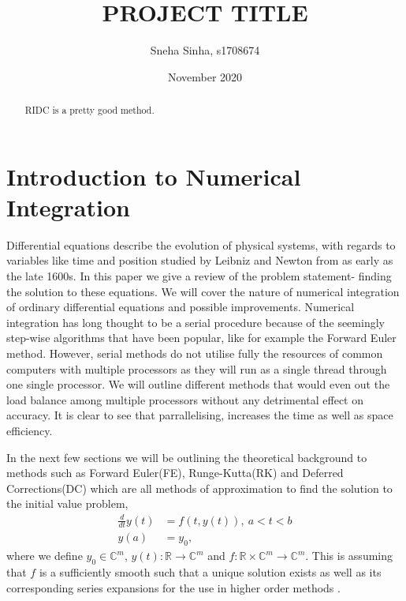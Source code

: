 \documentclass{report}
\title{PROJECT TITLE}
\author{Sneha Sinha, s1708674}
\date{November 2020}
\begin{document}
\maketitle

\begin{abstract}
RIDC is a pretty good method.
\end{abstract}

\tableofcontents
\newpage


\chapter{Introduction to Numerical Integration}

Differential equations describe the evolution of physical systems, with regards to variables like time and position studied by Leibniz and Newton from as early as the late 1600s. In this paper we give a review of the problem statement- finding the solution to these equations. We will cover the nature of numerical integration of ordinary differential equations and possible improvements. Numerical integration has long thought to be a serial procedure because of the seemingly step-wise algorithms that have been popular, like for example the Forward Euler method. However, serial methods do not utilise fully the resources of common computers with multiple processors as they will run as a single thread through one single processor. We will outline different methods that would even out the load balance among multiple processors without any detrimental effect on accuracy. It is clear to see that parrallelising, increases the time as well as space efficiency.

In the next few sections we will be outlining the theoretical background to methods such as Forward Euler(FE), Runge-Kutta(RK) and Deferred Corrections(DC) which are all methods of approximation to find the solution to the initial value problem, 
\begin{align}
    \frac{d}{dt} y(t) &= f(t, y(t)), \ a < t < b \label{eq:ivp}\\
    y(a) &= y_0, \label{eq:ics}
\end{align}
where we define $y_0 \in \mathbb{C}^m$, $y(t): \mathbb{R} \to \mathbb{C}^m$ and $f:\mathbb{R} \times \mathbb{C}^m \to \mathbb{C}^m$. This is assuming that $f$ is a sufficiently smooth such that a unique solution exists as well as its corresponding series expansions for the use in higher order methods \cite{ong-spiteri}. 
\end{document}
